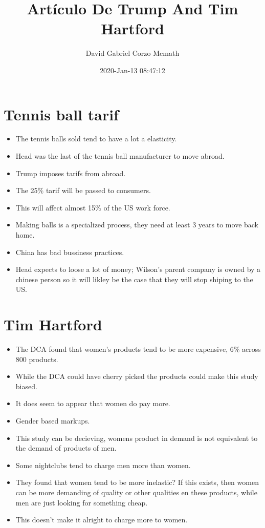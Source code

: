 \documentclass{article}
\title{Artículo De Trump And Tim Hartford}
\author{David Gabriel Corzo Mcmath}
\date{2020-Jan-13 08:47:12}
\begin{document}
\maketitle

\section{Tennis ball tarif}
\begin{itemize}
    \item The tennis balls sold tend to have a lot a elasticity. 
    \item Head was the last of the tennis ball manufacturer to move abroad.
    \item Trump imposes tarifs from abroad.
    \item The 25\% tarif will be passed to consumers.
    \item This will affect almost 15\% of the US work force.
    \item Making balls is a specialized process, they need at least 3 years to move back home.
    \item China has bad bussiness practices.
    \item Head expects to loose a lot of money; Wilson's parent company is owned by a chinese person so it will likley be the case that they will stop shiping to the US. 
\end{itemize}

\section{Tim Hartford}
\begin{itemize}
    \item The DCA found that women's products tend to be more expensive, 6\% across 800 products.
    \item While the DCA could have cherry picked the products could make this study biased.
    \item It does seem to appear that women do pay more.
    \item Gender based markups.
    \item This study can be decieving, womens product in demand is not equivalent to the demand of products of men.
    \item Some nightclubs tend to charge men more than women.
    \item They found that women tend to be more inelastic? If this exists, then women can be more demanding of quality or other qualities en these products, while men are just looking for something cheap.
    \item This doesn't make it alright to charge more to women.
\end{itemize}
\end{document}
